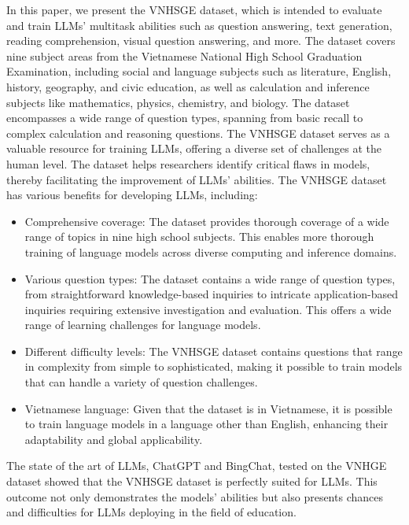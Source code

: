 \documentclass{article}
\begin{document}
{	In this paper, we present the VNHSGE dataset, which is intended to evaluate and train LLMs' multitask abilities such as question answering, text generation, reading comprehension, visual question answering, and more. The dataset covers nine subject areas from the Vietnamese National High School Graduation Examination, including social and language subjects such as literature, English, history, geography, and civic education, as well as calculation and inference subjects like mathematics, physics, chemistry, and biology. The dataset encompasses a wide range of question types, spanning from basic recall to complex calculation and reasoning questions. The VNHSGE dataset serves as a valuable resource for training LLMs, offering a diverse set of challenges at the human level. The dataset helps researchers identify critical flaws in models, thereby facilitating the improvement of LLMs' abilities. The VNHSGE dataset has various benefits for developing LLMs, including:

\begin{itemize}
	\item Comprehensive coverage: The dataset provides thorough coverage of a wide range of topics in nine high school subjects. This enables more thorough training of language models across diverse computing and inference domains.
	
	\item Various question types: The dataset contains a wide range of question types, from straightforward knowledge-based inquiries to intricate application-based inquiries requiring extensive investigation and evaluation. This offers a wide range of learning challenges for language models.
	
	\item Different difficulty levels: The VNHSGE dataset contains questions that range in complexity from simple to sophisticated, making it possible to train models that can handle a variety of question challenges.
	
	\item Vietnamese language: Given that the dataset is in Vietnamese, it is possible to train language models in a language other than English, enhancing their adaptability and global applicability.  
\end{itemize}

	The state of the art of LLMs, ChatGPT and BingChat, tested on the VNHGE dataset showed that the VNHSGE dataset is perfectly suited for LLMs. This outcome not only demonstrates the models' abilities but also presents chances and difficulties for LLMs deploying in the field of education.
	
}
\end{document}
